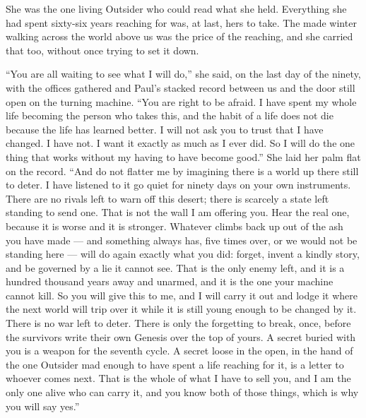 She was the one living Outsider who could read what she held. Everything she had spent sixty-six years reaching for was, at last, hers to take. The made winter walking across the world above us was the price of the reaching, and she carried that too, without once trying to set it down.\par

``You are all waiting to see what I will do,'' she said, on the last day of the ninety, with the offices gathered and Paul's stacked record between us and the door still open on the turning machine. ``You are right to be afraid. I have spent my whole life becoming the person who takes this, and the habit of a life does not die because the life has learned better. I will not ask you to trust that I have changed. I have not. I want it exactly as much as I ever did. So I will do the one thing that works without my having to have become good.'' She laid her palm flat on the record. ``And do not flatter me by imagining there is a world up there still to deter. I have listened to it go quiet for ninety days on your own instruments. There are no rivals left to warn off this desert; there is scarcely a state left standing to send one. That is not the wall I am offering you. Hear the real one, because it is worse and it is stronger. Whatever climbs back up out of the ash you have made --- and something always has, five times over, or we would not be standing here --- will do again exactly what you did: forget, invent a kindly story, and be governed by a lie it cannot see. That is the only enemy left, and it is a hundred thousand years away and unarmed, and it is the one your machine cannot kill. So you will give this to me, and I will carry it out and lodge it where the next world will trip over it while it is still young enough to be changed by it. There is no war left to deter. There is only the forgetting to break, once, before the survivors write their own Genesis over the top of yours. A secret buried with you is a weapon for the seventh cycle. A secret loose in the open, in the hand of the one Outsider mad enough to have spent a life reaching for it, is a letter to whoever comes next. That is the whole of what I have to sell you, and I am the only one alive who can carry it, and you know both of those things, which is why you will say yes.''\par

